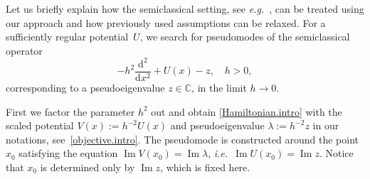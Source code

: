 \begin{Example}\label{ex:s-c}
Let us briefly explain how the semiclassical setting, see {\emph{e.g.}}~\cite{Davies_1999-NSA}, can be treated using our approach and how previously used assumptions can be relaxed. For a sufficiently regular potential~$U$, we search for pseudomodes 
of the semiclassical operator
\begin{equation}
- h^2 \frac{{\mathrm{d}}^2}{{\mathrm{d}} x^2} + U(x) -z, \quad h >0,
\end{equation}
corresponding to a pseudoeigenvalue $z \in {\mathbb{C}}$,
in the limit $h \to 0$. 

First we factor the parameter $h^2$ out and obtain \eqref{Hamiltonian.intro}
with the scaled potential $V(x) := h^{-2} U(x)$ 
and pseudoeigenvalue $\lambda := h^{-2} z$ in our notations,
see~\eqref{objective.intro}. 
The pseudomode is constructed around the point $x_0$ satisfying the equation ${\operatorname{Im}} V(x_0) = {\operatorname{Im}} \lambda$, {\emph{i.e.}}~${\operatorname{Im}} U(x_0) = {\operatorname{Im}} z$. Notice that $x_0$ is determined only by ${\operatorname{Im}} z$, which is fixed here. 


\end{Example}
